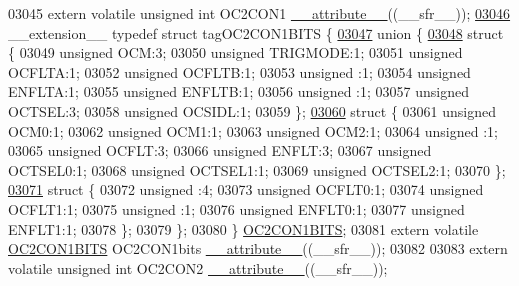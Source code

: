 \begin{DoxyCode}
03045 \textcolor{keyword}{extern} \textcolor{keyword}{volatile} \textcolor{keywordtype}{unsigned} \textcolor{keywordtype}{int}  OC2CON1 \hyperlink{a00009_a493c46f03454991ccc5aa7a6e1dfb2a7}{\_\_attribute\_\_}((\_\_sfr\_\_));
\hypertarget{a00009_source_l03046}{}\hyperlink{a00008}{03046} \_\_extension\_\_ \textcolor{keyword}{typedef} \textcolor{keyword}{struct }tagOC2CON1BITS \{
\hypertarget{a00009_source_l03047}{}\hyperlink{a00009}{03047}   \textcolor{keyword}{union }\{
\hypertarget{a00009_source_l03048}{}\hyperlink{a00009}{03048}     \textcolor{keyword}{struct }\{
03049       \textcolor{keywordtype}{unsigned} OCM:3;
03050       \textcolor{keywordtype}{unsigned} TRIGMODE:1;
03051       \textcolor{keywordtype}{unsigned} OCFLTA:1;
03052       \textcolor{keywordtype}{unsigned} OCFLTB:1;
03053       \textcolor{keywordtype}{unsigned} :1;
03054       \textcolor{keywordtype}{unsigned} ENFLTA:1;
03055       \textcolor{keywordtype}{unsigned} ENFLTB:1;
03056       \textcolor{keywordtype}{unsigned} :1;
03057       \textcolor{keywordtype}{unsigned} OCTSEL:3;
03058       \textcolor{keywordtype}{unsigned} OCSIDL:1;
03059     \};
\hypertarget{a00009_source_l03060}{}\hyperlink{a00009}{03060}     \textcolor{keyword}{struct }\{
03061       \textcolor{keywordtype}{unsigned} OCM0:1;
03062       \textcolor{keywordtype}{unsigned} OCM1:1;
03063       \textcolor{keywordtype}{unsigned} OCM2:1;
03064       \textcolor{keywordtype}{unsigned} :1;
03065       \textcolor{keywordtype}{unsigned} OCFLT:3;
03066       \textcolor{keywordtype}{unsigned} ENFLT:3;
03067       \textcolor{keywordtype}{unsigned} OCTSEL0:1;
03068       \textcolor{keywordtype}{unsigned} OCTSEL1:1;
03069       \textcolor{keywordtype}{unsigned} OCTSEL2:1;
03070     \};
\hypertarget{a00009_source_l03071}{}\hyperlink{a00009}{03071}     \textcolor{keyword}{struct }\{
03072       \textcolor{keywordtype}{unsigned} :4;
03073       \textcolor{keywordtype}{unsigned} OCFLT0:1;
03074       \textcolor{keywordtype}{unsigned} OCFLT1:1;
03075       \textcolor{keywordtype}{unsigned} :1;
03076       \textcolor{keywordtype}{unsigned} ENFLT0:1;
03077       \textcolor{keywordtype}{unsigned} ENFLT1:1;
03078     \};
03079   \};
03080 \} \hyperlink{a00008_d0/d8d/a00612}{OC2CON1BITS};
03081 \textcolor{keyword}{extern} \textcolor{keyword}{volatile} \hyperlink{a00008_d0/d8d/a00612}{OC2CON1BITS} OC2CON1bits \hyperlink{a00009_a493c46f03454991ccc5aa7a6e1dfb2a7}{\_\_attribute\_\_}((\_\_sfr\_\_));
03082 
03083 \textcolor{keyword}{extern} \textcolor{keyword}{volatile} \textcolor{keywordtype}{unsigned} \textcolor{keywordtype}{int}  OC2CON2 \hyperlink{a00009_a493c46f03454991ccc5aa7a6e1dfb2a7}{\_\_attribute\_\_}((\_\_sfr\_\_));

\end{DoxyCode}
